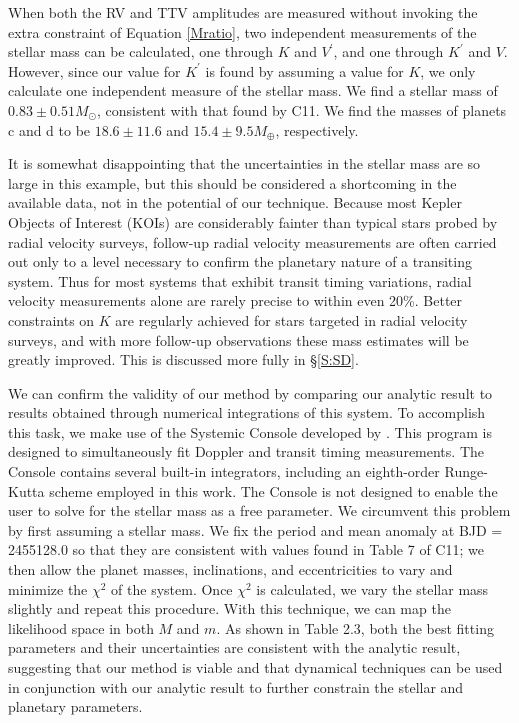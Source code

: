 When both the RV and TTV amplitudes are measured without invoking the extra constraint of Equation \ref{Mratio}, two independent measurements of the stellar mass can be calculated, one through $K$ and $V^\prime$, and one through $K^\prime$ and $V$. However, since our value for $K^\prime$ is found by assuming a value for $K$, we only calculate one independent measure of the stellar mass. We find a stellar mass of $0.83 \pm 0.51 M_\odot$, consistent with that found by C11. We find the masses of planets c and d to be $18.6 \pm 11.6$ and $15.4 \pm 9.5 M_\oplus$, respectively.

It is somewhat disappointing that the uncertainties in the stellar mass are so large in this example, but this should be considered a shortcoming in the available data, not in the potential of our technique. Because most Kepler Objects of Interest (KOIs) are considerably fainter than typical stars probed by radial velocity surveys, follow-up radial velocity measurements are often carried out only to a level necessary to confirm the planetary nature of a transiting system. Thus for most systems that exhibit transit timing variations, radial velocity measurements alone are rarely precise to within even 20\%. Better constraints on $K$ are regularly achieved for stars targeted in radial velocity surveys, and with more follow-up observations these mass estimates will be greatly improved. This is discussed more fully in \S\ref{S:SD}.

We can confirm the validity of our method by comparing our analytic result to results obtained through numerical integrations of this system. To accomplish this task, we make use of the Systemic Console developed by \citet{Meschiari09}. This program is designed to simultaneously fit Doppler and transit timing measurements. The Console contains several built-in integrators, including an eighth-order Runge-Kutta scheme employed in this work. The Console is not designed to enable the user to solve for the stellar mass as a free parameter. We circumvent this problem by first assuming a stellar mass. We fix the period and mean anomaly at BJD = 2455128.0 so that they are consistent with values found in Table 7 of C11; we then allow the planet masses, inclinations, and eccentricities to vary and minimize the $\chi^2$ of the system. Once $\chi^2$ is calculated, we vary the stellar mass slightly and repeat this procedure. With this technique, we can map the likelihood space in both $M$ and $m$. As shown in Table 2.3, both the best fitting parameters and their uncertainties are consistent with the analytic result, suggesting that our method is viable and that dynamical techniques can be used in conjunction with our analytic result to further constrain the stellar and planetary parameters. 

